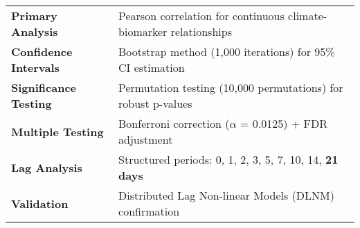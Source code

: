 \documentclass[11pt,a4paper,landscape]{article}
\begin{document}
\begin{adjustbox}{width=\textwidth,center}
\renewcommand{\arraystretch}{1.6}
\begin{tabular}{@{}l>{\raggedright\arraybackslash}p{10cm}@{}}
\toprule
\rowcolor{enbelpurple}
\multicolumn{2}{@{}l@{}}{\textcolor{white}{\textbf{\Large STATISTICAL METHODOLOGY}}} \\
\midrule
\textbf{Primary Analysis} & Pearson correlation for continuous climate-biomarker relationships \\
\rowcolor{lightblue}
\textbf{Confidence Intervals} & Bootstrap method (1,000 iterations) for 95\% CI estimation \\
\textbf{Significance Testing} & Permutation testing (10,000 permutations) for robust p-values \\
\rowcolor{lightblue}
\textbf{Multiple Testing} & Bonferroni correction ($\alpha$ = 0.0125) + FDR adjustment \\
\textbf{Lag Analysis} & Structured periods: 0, 1, 2, 3, 5, 7, 10, 14, \textcolor{enbelorange}{\textbf{21 days}} \\
\rowcolor{lightblue}
\textbf{Validation} & Distributed Lag Non-linear Models (DLNM) confirmation \\
\bottomrule
\end{tabular}
\end{adjustbox}

\vspace{1.5em}

\begin{center}
\end{center}
\end{document}
